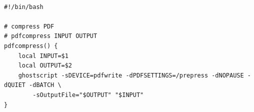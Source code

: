 \documentclass{blog}
\begin{document}
\begin{example}~
    \begin{verbatim}
#!/bin/bash

# compress PDF
# pdfcompress INPUT OUTPUT
pdfcompress() {
    local INPUT=$1
    local OUTPUT=$2
    ghostscript -sDEVICE=pdfwrite -dPDFSETTINGS=/prepress -dNOPAUSE -dQUIET -dBATCH \
        -sOutputFile="$OUTPUT" "$INPUT"
}
\end{verbatim}
\end{example}

\end{document}
